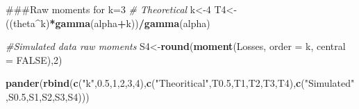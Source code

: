 \documentclass[]{book}
\newenvironment{Shaded}{\begin{snugshade}}{\end{snugshade}}
\newcommand{\KeywordTok}[1]{\textcolor[rgb]{0.13,0.29,0.53}{\textbf{#1}}}
\newcommand{\DataTypeTok}[1]{\textcolor[rgb]{0.13,0.29,0.53}{#1}}
\newcommand{\DecValTok}[1]{\textcolor[rgb]{0.00,0.00,0.81}{#1}}
\newcommand{\FloatTok}[1]{\textcolor[rgb]{0.00,0.00,0.81}{#1}}
\newcommand{\StringTok}[1]{\textcolor[rgb]{0.31,0.60,0.02}{#1}}
\newcommand{\CommentTok}[1]{\textcolor[rgb]{0.56,0.35,0.01}{\textit{#1}}}
\newcommand{\OtherTok}[1]{\textcolor[rgb]{0.56,0.35,0.01}{#1}}
\newcommand{\OperatorTok}[1]{\textcolor[rgb]{0.81,0.36,0.00}{\textbf{#1}}}
\newcommand{\NormalTok}[1]{#1}
\theoremstyle{definition}
\theoremstyle{definition}
\theoremstyle{definition}
\theoremstyle{remark}
\begin{document}
\begin{Shaded}
\begin{Highlighting}[]
\NormalTok{###Raw moments for k=3}
\CommentTok{# Theoretical }
\NormalTok{k<-}\DecValTok{4}
\NormalTok{T4<-((theta}\OperatorTok{^}\NormalTok{k)}\OperatorTok{*}\KeywordTok{gamma}\NormalTok{(alpha}\OperatorTok{+}\NormalTok{k))}\OperatorTok{/}\KeywordTok{gamma}\NormalTok{(alpha)}

\CommentTok{#Simulated data raw moments}
\NormalTok{S4<-}\KeywordTok{round}\NormalTok{(}\KeywordTok{moment}\NormalTok{(Losses, }\DataTypeTok{order =}\NormalTok{ k, }\DataTypeTok{central =} \OtherTok{FALSE}\NormalTok{),}\DecValTok{2}\NormalTok{)}

\KeywordTok{pander}\NormalTok{(}\KeywordTok{rbind}\NormalTok{(}\KeywordTok{c}\NormalTok{(}\StringTok{"k"}\NormalTok{,}\FloatTok{0.5}\NormalTok{,}\DecValTok{1}\NormalTok{,}\DecValTok{2}\NormalTok{,}\DecValTok{3}\NormalTok{,}\DecValTok{4}\NormalTok{),}\KeywordTok{c}\NormalTok{(}\StringTok{"Theoritical"}\NormalTok{,T0.}\DecValTok{5}\NormalTok{,T1,T2,T3,T4),}\KeywordTok{c}\NormalTok{(}\StringTok{"Simulated"}\NormalTok{,S0.}\DecValTok{5}\NormalTok{,S1,S2,S3,S4)))}
\end{Highlighting}
\end{Shaded}
\end{document}
